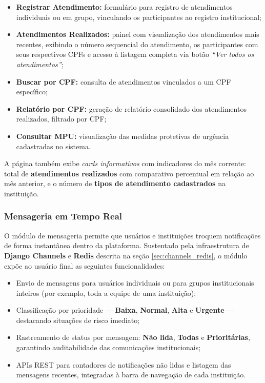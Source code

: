 \begin{itemize}
    \item \textbf{Registrar Atendimento:} formulário para registro de atendimentos individuais ou em grupo, vinculando os participantes ao registro institucional;
    \item \textbf{Atendimentos Realizados:} painel com visualização dos atendimentos mais recentes, exibindo o número sequencial do atendimento, os participantes com seus respectivos CPFs e acesso à listagem completa via botão \textit{``Ver todos os atendimentos''};
    \item \textbf{Buscar por CPF:} consulta de atendimentos vinculados a um CPF específico;
    \item \textbf{Relatório por CPF:} geração de relatório consolidado dos atendimentos realizados, filtrado por CPF;
    \item \textbf{Consultar MPU:} visualização das medidas protetivas de urgência cadastradas no sistema.
\end{itemize}

\par A página também exibe \textit{cards informativos} com indicadores do mês corrente: total de \textbf{atendimentos realizados} com comparativo percentual em relação ao mês anterior, e o número de \textbf{tipos de atendimento cadastrados} na instituição.

\subsubsection{Mensageria em Tempo Real}
\par O módulo de mensageria permite que usuários e instituições troquem notificações de forma instantânea dentro da plataforma. Sustentado pela infraestrutura de \textbf{Django Channels} e \textbf{Redis} descrita na seção \ref{sec:channels_redis}, o módulo expõe ao usuário final as seguintes funcionalidades:

\begin{itemize}
   \item Envio de mensagens para usuários individuais ou para grupos institucionais inteiros (por exemplo, toda a equipe de uma instituição);
   \item Classificação por prioridade — \textbf{Baixa}, \textbf{Normal}, \textbf{Alta} e \textbf{Urgente} — destacando situações de risco imediato;
   \item Rastreamento de status por mensagem: \textbf{Não lida}, \textbf{Todas} e \textbf{Prioritárias}, garantindo auditabilidade das comunicações institucionais;
   \item APIs REST para contadores de notificações não lidas e listagem das mensagens recentes, integradas à barra de navegação de cada instituição.
\end{itemize}

